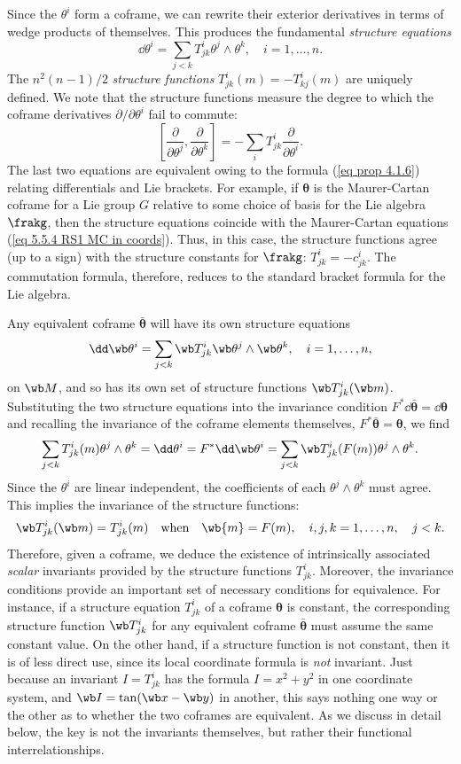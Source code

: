 Since the $\theta^i$ form a coframe, we can rewrite their exterior derivatives in terms of wedge products of themselves. This produces the fundamental \emph{structure equations}
\[\dd\theta^i=\sum_{j<k}T^i_{jk}\theta^j\wedge\theta^k,\quad i=1,\ldots,n.\]
The $n^2(n-1)/2$ \emph{structure functions} $T^i_{jk}(m)=-T^i_{kj}(m)$ are uniquely defined. We note that the structure functions measure the degree to which the coframe derivatives $\partial/\partial\theta^i$ fail to commute:
\[\left[\frac{\partial}{\partial\theta^j},\frac{\partial}{\partial\theta^k}\right]=-\sum_i T^i_{jk}\frac{\partial}{\partial\theta^i}.\label{eq 8.10 Olver93}\]
The last two equations are equivalent owing to the formula (\ref{eq prop 4.1.6}) relating differentials and Lie brackets. For example, if $\bm\theta$ is the Maurer-Cartan coframe for a Lie group $G$ relative to some choice of basis for the Lie algebra $\frakg$, then the structure equations coincide with the Maurer-Cartan equations (\ref{eq 5.5.4 RS1 MC in coords}). Thus, in this case, the structure functions agree (up to a sign) with the structure constants for $\frakg$: $T^i_{jk}=-c^i_{jk}$. The commutation formula, therefore, reduces to the standard bracket formula for the Lie algebra.

Any equivalent coframe $\bar{\bm\theta}$ will have its own structure equations 
\[\dd\wb\theta^i=\sum_{j<k}\wb T^i_{jk}\wb\theta^j\wedge\wb\theta^k,\quad i=1,\ldots,n,\]
on $\wb M$, and so has its own set of structure functions $\wb T^i_{jk}(\wb m)$. Substituting the two structure equations into the invariance condition $F^\ast \dd \bar{\bm\theta}=\dd \bm\theta$ and recalling the invariance of the coframe elements themselves, $F^\ast \bar{\bm\theta}=\bm\theta$, we find 
\[\sum_{j<k}T^i_{jk}(m)\theta^j\wedge\theta^k=\dd\theta^i=F^\ast\dd \wb\theta^i=\sum_{j<k}\wb T^i_{jk}(F(m))\theta^j\wedge\theta^k.\]
Since the $\theta^i$ are linear independent, the coefficients of each $\theta^j\wedge\theta^k$ must agree. This implies the invariance of the structure functions:
\[\wb T^i_{jk}(\wb m)=T^i_{jk}(m) \quad \text{when}\quad \wb{m}=F(m),\quad i,j,k=1,\ldots,n,\quad j<k.\label{eq 8.12 Olver93}\]
Therefore, given a coframe, we deduce the existence of intrinsically associated \emph{scalar} invariants provided by the structure functions $T^i_{jk}$. Moreover, the invariance conditions provide an important set of necessary conditions for equivalence. For instance, if a structure equation $T^i_{jk}$ of a coframe $\bm\theta$ is constant, the corresponding structure function $\wb T^i_{jk}$ for any equivalent coframe $\bar{\bm\theta}$ must assume the same constant value. On the other hand, if a structure function is not constant, then it is of less direct use, since its local coordinate formula is \emph{not} invariant. Just because an invariant $I=T^i_{jk}$ has the formula $I=x^2+y^2$ in one coordinate system, and $\wb I=\tan(\wb x-\wb y)$ in another, this says nothing one way or the other as to whether the two coframes are equivalent. As we discuss in detail below, the key is not the invariants themselves, but rather their functional interrelationships.

